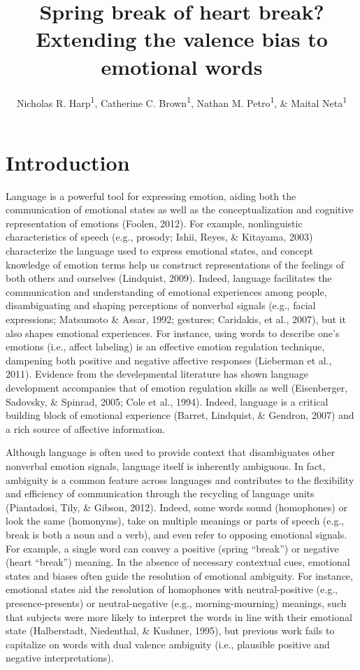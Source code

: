 \documentclass[man]{apa6}
\title{Spring break of heart break? Extending the valence bias to emotional words}
\author{Nicholas R. Harp\textsuperscript{1}, Catherine C. Brown\textsuperscript{1}, Nathan M. Petro\textsuperscript{1}, \& Maital Neta\textsuperscript{1}}
\date{}
\affiliation{
\vspace{0.5cm}
\textsuperscript{1} University of Nebraska-Lincoln}
\begin{document}
\maketitle

\hypertarget{introduction}{%
\section{Introduction}\label{introduction}}

Language is a powerful tool for expressing emotion, aiding both the communication of emotional states as well as the conceptualization and cognitive representation of emotions (Foolen, 2012). For example, nonlinguistic characteristics of speech (e.g., prosody; Ishii, Reyes, \& Kitayama, 2003) characterize the language used to express emotional states, and concept knowledge of emotion terms help us construct representations of the feelings of both others and ourselves (Lindquist, 2009). Indeed, language facilitates the communication and understanding of emotional experiences among people, disambiguating and shaping perceptions of nonverbal signals (e.g., facial expressions; Matsumoto \& Assar, 1992; gestures; Caridakis, et al., 2007), but it also shapes emotional experiences. For instance, using words to describe one's emotions (i.e., affect labeling) is an effective emotion regulation technique, dampening both positive and negative affective responses (Lieberman et al., 2011). Evidence from the develepmental literature has shown language development accompanies that of emotion regulation skills as well (Eisenberger, Sadovsky, \& Spinrad, 2005; Cole et al., 1994). Indeed, language is a critical building block of emotional experience (Barret, Lindquist, \& Gendron, 2007) and a rich source of affective information.

Although language is often used to provide context that disambiguates other nonverbal emotion signals, language itself is inherently ambiguous. In fact, ambiguity is a common feature across languages and contributes to the flexibility and efficiency of communication through the recycling of language units (Piantadosi, Tily, \& Gibson, 2012). Indeed, some words sound (homophones) or look the same (homonyms), take on multiple meanings or parts of speech (e.g., break is both a noun and a verb), and even refer to opposing emotional signals. For example, a single word can convey a positive (spring \enquote{break}) or negative (heart \enquote{break}) meaning. In the absence of necessary contextual cues, emotional states and biases often guide the resolution of emotional ambiguity. For instance, emotional states aid the resolution of homophones with neutral-positive (e.g., presence-presents) or neutral-negative (e.g., morning-mourning) meanings, such that subjects were more likely to interpret the words in line with their emotional state (Halberstadt, Niedenthal, \& Kushner, 1995), but previous work fails to capitalize on words with dual valence ambiguity (i.e., plausible positive and negative interpretations).
\end{document}

